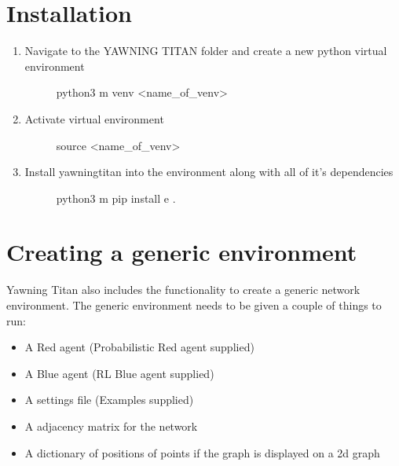 \documentclass[letterpaper,10pt,english]{sphinxmanual}
\begin{document}
\section{Installation}
\label{\detokenize{source/getting_started:installation}}\begin{enumerate}
%
\item {} \begin{description}
\item[{Navigate to the YAWNING TITAN folder and create a new python virtual environment}] \leavevmode
\sphinxAtStartPar
python3 \sphinxhyphen{}m venv \textless{}name\_of\_venv\textgreater{}

\end{description}

\item {} \begin{description}
\item[{Activate virtual environment}] \leavevmode
\sphinxAtStartPar
source \textless{}name\_of\_venv\textgreater{}

\end{description}

\item {} \begin{description}
\item[{Install yawning\sphinxhyphen{}titan into the environment along with all of it’s dependencies}] \leavevmode
\sphinxAtStartPar
python3 \sphinxhyphen{}m pip install \sphinxhyphen{}e .

\end{description}

\end{enumerate}


\section{Creating a generic environment}
\label{\detokenize{source/getting_started:creating-a-generic-environment}}
\sphinxAtStartPar
Yawning Titan also includes the functionality to create a
generic network environment. The generic environment needs to
be given a couple of things to run:
\begin{itemize}
\item {}
\sphinxAtStartPar
A Red agent (Probabilistic Red agent supplied)

\item {}
\sphinxAtStartPar
A Blue agent  (RL Blue agent supplied)

\item {}
\sphinxAtStartPar
A settings file (Examples supplied)

\item {}
\sphinxAtStartPar
A adjacency matrix for the network

\item {}
\sphinxAtStartPar
A dictionary of positions of points if the graph is displayed on a 2d graph

\end{itemize}
\end{document}
